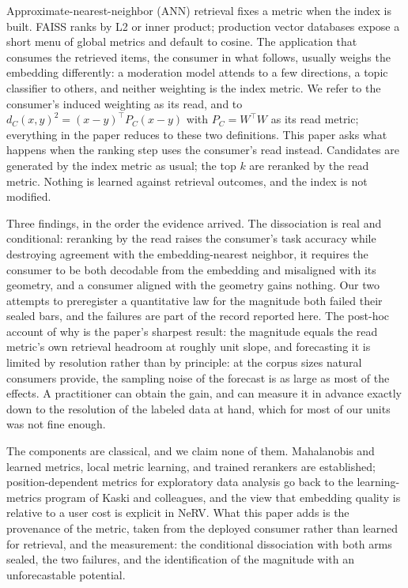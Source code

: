 \documentclass{article}
\begin{document}
Approximate-nearest-neighbor (ANN) retrieval fixes a metric when the index is
built. FAISS ranks by L2 or inner product; production vector databases expose
a short menu of global metrics and default to cosine. The application that
consumes the retrieved items, the consumer in what follows, usually weighs
the embedding differently: a moderation model attends to a few directions, a
topic classifier to others, and neither weighting is the index metric. We
refer to the consumer's induced weighting as its read, and to
$d_C(x,y)^2=(x-y)^\top P_C(x-y)$ with $P_C=W^\top W$ as its read metric;
everything in the paper reduces to these two definitions. This paper asks what happens
when the ranking step uses the consumer's read instead. Candidates are
generated by the index metric as usual; the top $k$ are reranked by the
read metric. Nothing is learned against retrieval outcomes, and the index is
not modified.

Three findings, in the order the evidence arrived. The dissociation is real
and conditional: reranking by the read raises the consumer's task accuracy
while destroying agreement with the embedding-nearest neighbor, it requires
the consumer to be both decodable from the embedding and misaligned with its
geometry, and a consumer aligned with the geometry gains nothing. Our two
attempts to preregister a quantitative law for the magnitude both failed
their sealed bars, and the failures are part of the record reported here.
The post-hoc account of why is the paper's sharpest result: the magnitude
equals the read metric's own retrieval headroom at roughly unit slope, and
forecasting it is limited by resolution rather than by principle: at the
corpus sizes natural consumers provide, the sampling noise of the forecast
is as large as most of the effects. A practitioner can obtain the gain, and
can measure it in advance exactly down to the resolution of the labeled
data at hand, which for most of our units was not fine enough.

The components are classical, and we claim none of them. Mahalanobis and
learned metrics, local metric learning, and trained rerankers are established;
position-dependent metrics for exploratory data analysis go back to the
learning-metrics program of Kaski and colleagues, and the view that embedding
quality is relative to a user cost is explicit in NeRV. What this paper adds
is the provenance of the metric, taken from the deployed consumer rather than
learned for retrieval, and the measurement: the conditional dissociation with
both arms sealed, the two failures, and the identification of the
magnitude with an unforecastable potential.
\end{document}
